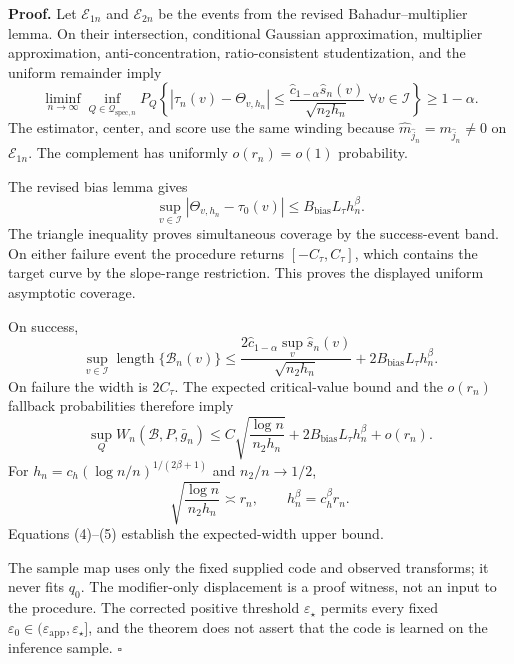 \textbf{Proof.}
Let \(\mathcal E_{1n}\) and \(\mathcal E_{2n}\) be the events from the revised Bahadur--multiplier lemma.  On their intersection, conditional Gaussian approximation, multiplier approximation, anti-concentration, ratio-consistent studentization, and the uniform remainder imply
\[
 \liminf_{n\to\infty}\inf_{Q\in\mathcal Q_{\mathrm{spec},n}}
 P_Q\left\{|\widehat\tau_n(v)-\Theta_{v,h_n}|
 \le\frac{\widehat c_{1-\alpha}\widehat s_n(v)}
 {\sqrt{n_2h_n}}\ \forall v\in\mathcal I\right\}\ge1-\alpha. \tag{1}
\]
The estimator, center, and score use the same winding because
\(\widehat m_{\widehat j_n}=m_{\widehat j_n}\ne0\) on
\(\mathcal E_{1n}\).  The complement has uniformly \(o(r_n)=o(1)\) probability.

The revised bias lemma gives
\[
 \sup_{v\in\mathcal I}|\Theta_{v,h_n}-\tau_0(v)|
 \le B_{\mathrm{bias}}L_\tau h_n^\beta. \tag{2}
\]
The triangle inequality proves simultaneous coverage by the success-event band.  On either failure event the procedure returns
\([-C_\tau,C_\tau]\), which contains the target curve by the slope-range restriction.  This proves the displayed uniform asymptotic coverage.

On success,
\[
 \sup_{v\in\mathcal I}\operatorname{length}\{\mathcal B_n(v)\}
 \le\frac{2\widehat c_{1-\alpha}\sup_v\widehat s_n(v)}
 {\sqrt{n_2h_n}}+2B_{\mathrm{bias}}L_\tau h_n^\beta. \tag{3}
\]
On failure the width is \(2C_\tau\).  The expected critical-value bound and the
\(o(r_n)\) fallback probabilities therefore imply
\[
 \sup_QW_n(\mathcal B,P,\bar g_n)
 \le C\sqrt{\frac{\log n}{n_2h_n}}
 +2B_{\mathrm{bias}}L_\tau h_n^\beta+o(r_n). \tag{4}
\]
For \(h_n=c_h(\log n/n)^{1/(2\beta+1)}\) and \(n_2/n\to1/2\),
\[
 \sqrt{\frac{\log n}{n_2h_n}}\asymp r_n,\qquad
 h_n^\beta=c_h^\beta r_n. \tag{5}
\]
Equations (4)--(5) establish the expected-width upper bound.

The sample map uses only the fixed supplied code and observed transforms; it never fits \(q_0\).  The modifier-only displacement is a proof witness, not an input to the procedure.  The corrected positive threshold \(\varepsilon_\star\) permits every fixed
\(\varepsilon_0\in(\varepsilon_{\mathrm{app}},\varepsilon_\star]\), and the theorem does not assert that the code is learned on the inference sample. \(\square\)